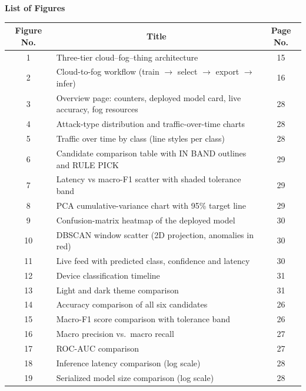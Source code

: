 \documentclass[12pt,a4paper]{article}
\begin{document}
\begin{center}
    \textbf{\Large List of Figures}
\end{center}

\vspace{0.4cm}

\begin{center}
\renewcommand{\arraystretch}{1.15}
\noindent
\begin{tabular}{|c|p{10.1cm}|c|}
\hline
\textbf{Figure No.} & \multicolumn{1}{c|}{\textbf{Title}} & \textbf{Page No.} \\
\hline
1 & Three-tier cloud--fog--thing architecture & 15 \\
\hline
2 & Cloud-to-fog workflow (train $\rightarrow$ select $\rightarrow$ export $\rightarrow$ infer) & 16 \\
\hline
3 & Overview page: counters, deployed model card, live accuracy, fog resources & 28 \\
\hline
4 & Attack-type distribution and traffic-over-time charts & 28 \\
\hline
5 & Traffic over time by class (line styles per class) & 28 \\
\hline
6 & Candidate comparison table with IN BAND outlines and RULE PICK & 29 \\
\hline
7 & Latency vs macro-F1 scatter with shaded tolerance band & 29 \\
\hline
8 & PCA cumulative-variance chart with 95\% target line & 29 \\
\hline
9 & Confusion-matrix heatmap of the deployed model & 30 \\
\hline
10 & DBSCAN window scatter (2D projection, anomalies in red) & 30 \\
\hline
11 & Live feed with predicted class, confidence and latency & 30 \\
\hline
12 & Device classification timeline & 31 \\
\hline
13 & Light and dark theme comparison & 31 \\
\hline
14 & Accuracy comparison of all six candidates & 26 \\
\hline
15 & Macro-F1 score comparison with tolerance band & 26 \\
\hline
16 & Macro precision vs.\ macro recall & 27 \\
\hline
17 & ROC-AUC comparison & 27 \\
\hline
18 & Inference latency comparison (log scale) & 28 \\
\hline
19 & Serialized model size comparison (log scale) & 28 \\
\hline
\end{tabular}
\end{center}
\end{document}
